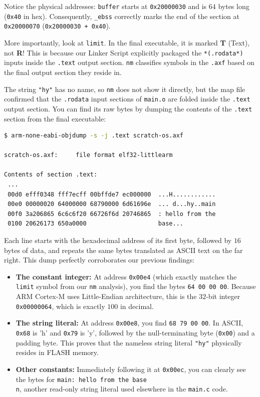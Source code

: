Notice the physical addresses: \texttt{buffer} starts at \texttt{0x20000030} and is $64$ bytes long (\texttt{0x40} in hex). Consequently, \texttt{\_ebss} correctly marks the end of the section at \texttt{0x20000070} (\texttt{0x20000030 + 0x40}).

More importantly, look at \texttt{limit}. In the final executable, it is marked \textbf{T} (Text), not \textbf{R}! This is because our Linker Script explicitly packaged the \texttt{*(.rodata*)} inputs inside the \texttt{.text} output section. \texttt{nm} classifies symbols in the \texttt{.axf} based on the final output section they reside in.

The string \texttt{"hy"} has no name, so \texttt{nm} does not show it directly, but the map file confirmed that the \texttt{.rodata} input sections of \texttt{main.o} are folded inside the \texttt{.text} output section. You can find its raw bytes by dumping the contents of the \texttt{.text} section from the final executable:

\begin{lstlisting}[language=bash]
$ arm-none-eabi-objdump -s -j .text scratch-os.axf

scratch-os.axf:     file format elf32-littlearm

Contents of section .text:
 ...
 00d0 efff0348 fff7ecff 00bffde7 ec000000  ...H............
 00e0 00000020 64000000 68790000 6d61696e  ... d...hy..main
 00f0 3a206865 6c6c6f20 66726f6d 20746865  : hello from the
 0100 20626173 650a0000                    base...
\end{lstlisting}

Each line starts with the hexadecimal address of its first byte, followed by $16$ bytes of data, and repeats the same bytes translated as ASCII text on the far right. This dump perfectly corroborates our previous findings:
\begin{itemize}
    \item \textbf{The constant integer:} At address \texttt{0x00e4} (which exactly matches the \texttt{limit} symbol from our \texttt{nm} analysis), you find the bytes \texttt{64 00 00 00}. Because ARM Cortex-M uses Little-Endian architecture, this is the $32$-bit integer \texttt{0x00000064}, which is exactly $100$ in decimal.
    \item \textbf{The string literal:} At address \texttt{0x00e8}, you find \texttt{68 79 00 00}. In ASCII, \texttt{0x68} is 'h' and \texttt{0x79} is 'y', followed by the null-terminating byte (\texttt{0x00}) and a padding byte. This proves that the nameless string literal \texttt{"hy"} physically resides in FLASH memory.
    \item \textbf{Other constants:} Immediately following it at \texttt{0x00ec}, you can clearly see the bytes for \texttt{main: hello from the base\\n}, another read-only string literal used elsewhere in the \texttt{main.c} code.
\end{itemize}

